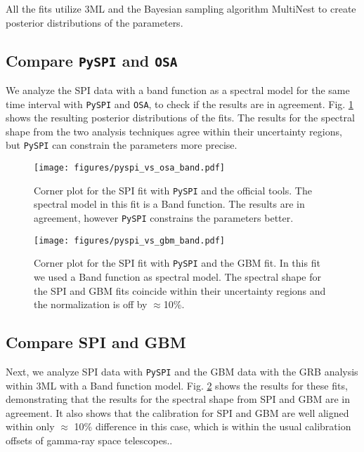 \documentclass[twocolumn]{aa}
\begin{document}
All the fits utilize 3ML \citep{3ML} and the Bayesian sampling algorithm MultiNest \citep{multinest} to create posterior distributions of the parameters.



\subsection{Compare {\tt PySPI} and {\tt OSA}}
\label{pyspi_osa}
We analyze the SPI data with a band function as a spectral model for the same time interval with {\tt PySPI} and {\tt OSA}, to check if the results are in agreement. Fig. \ref{fig:corner_osa_pyspi_band} shows the resulting posterior distributions of the fits. The results for the spectral shape from the two analysis techniques agree within their uncertainty regions, but {\tt PySPI} can constrain the parameters more precise.

\begin{figure}
  \begin{centering}
    \texttt{[image: figures/pyspi\_vs\_osa\_band.pdf]}
    \caption{Corner plot for the SPI fit with {\tt PySPI} and the official tools. The spectral model in this fit is a Band function. The results are in agreement, however {\tt PySPI} constrains the parameters better.}
    \label{fig:corner_osa_pyspi_band}
  \end{centering}
\end{figure}
\begin{figure}
  \begin{centering}
    \texttt{[image: figures/pyspi\_vs\_gbm\_band.pdf]}
    \caption{Corner plot for the SPI fit with {\tt PySPI} and the GBM fit. In this fit we used a Band function as spectral model. The spectral shape for the SPI and GBM fits coincide within their uncertainty regions and the normalization is off by $\approx$10\%.}
    \label{fig:corner_gbm_pyspi_band}
  \end{centering}
\end{figure}

\subsection{Compare SPI and GBM}
\label{pyspi_gbm}
Next, we analyze SPI data with {\tt PySPI} and the GBM data with the GRB analysis within 3ML with a Band function model. Fig. \ref{fig:corner_gbm_pyspi_band} shows the results for these fits, demonstrating that the results for the spectral shape from SPI and GBM are in agreement. It also shows that the calibration for SPI and GBM are well aligned within only $\approx$ 10\% difference in this case, which is within the usual calibration offsets of gamma-ray space telescopes..
\end{document}

